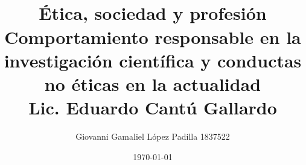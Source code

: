 \documentclass[aspectratio=169]{beamer}
\title[]{\changefontsizes{15pt}\vspace{0.5cm}\\\textbf{Ética, sociedad y profesión}\\Comportamiento responsable en la investigación 
científica y conductas no éticas en la actualidad\\
Lic. Eduardo Cantú Gallardo}
\author{Giovanni Gamaliel López Padilla \hspace{1cm} 1837522}
\date{\today}
\begin{document}
\begin{frame}[plain]
\maketitle
\end{frame}




\end{document}
